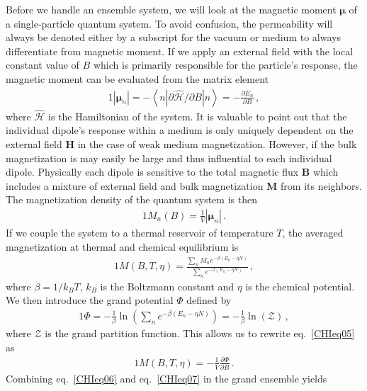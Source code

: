 \documentclass[
aps,
pra,
showpacs,
preprintnumbers,
amsmath,
amssymb,
footinbib
]{revtex4-2}
\begin{document}
Before we handle an ensemble system, we will look at the magnetic moment $\boldsymbol{\mu}$ of a single-particle quantum system. To avoid confusion, the permeability will always be denoted either by a subscript for the vacuum or medium to always differentiate from magnetic moment. If we apply an external field with the local constant value of $B$ which is primarily responsible for the particle's response, the magnetic moment can be evaluated from the matrix element
\begin{alignat}{1}
  \label{CHIeq03} \left|\boldsymbol{\mu}_{n}\right|=-\left\langle n\left|\partial\hat{\mathcal{H}}/\partial B\right|n\right\rangle=-\frac{\partial E_{n}}{\partial B}\,,
\end{alignat}
where $\hat{\mathcal{H}}$ is the Hamiltonian of the system. It is valuable to point out that the individual dipole's response within a medium is only uniquely dependent on the external field $\textbf{H}$ in the case of weak medium magnetization. However, if the bulk magnetization is may easily be large and thus influential to each individual dipole. Physically each dipole is sensitive to the total magnetic flux $\textbf{B}$ which includes a mixture of external field and bulk magnetization $\textbf{M}$ from its neighbors. The magnetization density of the quantum system is then
\begin{alignat}{1}
  \label{CHIeq04} M_{n}(B)=\frac{1}{V}\left|\boldsymbol{\mu}_{n}\right|\,.
\end{alignat}
If we couple the system to a thermal reservoir of temperature $T$, the averaged magnetization at thermal and chemical equilibrium is
\begin{alignat}{1}
  \label{CHIeq05} M(B,T,\eta)=\frac{\sum_{n}M_{n}e^{-\beta (E_{n}-\eta N)}}{\sum_{n}e^{-\beta (E_{n}-\eta N)}}\,,
\end{alignat}
where $\beta=1/k_{B}T$, $k_{B}$ is the Boltzmann constant and $\eta$ is the chemical potential. We then introduce the grand potential $\Phi$ defined by
\begin{alignat}{1}
  \label{CHIeq06} \Phi=-\frac{1}{\beta}\ln\left({\sum_{n}e^{-\beta (E_{n}-\eta N)}}\right)=-\frac{1}{\beta}\ln\left(\mathcal{Z}\right)\,,
\end{alignat}
where $\mathcal{Z}$ is the grand partition function. This allows us to rewrite eq.~\eqref{CHIeq05} as
\begin{alignat}{1}
  \label{CHIeq07} M(B,T,\eta)=-\frac{1}{V}\frac{\partial \Phi}{\partial B}\,.
\end{alignat}
Combining eq.~\eqref{CHIeq06} and eq.~\eqref{CHIeq07} in the grand ensemble yields
\end{document}
